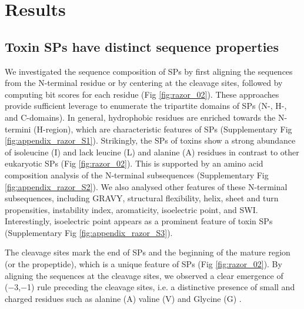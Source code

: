 \section{Results}
\subsection{Toxin SPs have distinct sequence properties}
We investigated the sequence composition of SPs by first aligning the sequences from the N-terminal residue or by centering at the cleavage sites, followed by computing bit scores for each residue (Fig  \ref{fig:razor_02}). These approaches provide sufficient leverage to enumerate the tripartite domains of SPs (N-, H-, and C-domains). In general, hydrophobic residues are enriched towards the N-termini (H-region), which are characteristic features of SPs \cite{Von_Heijne1990-sb} (Supplementary Fig \ref{fig:appendix_razor_S1}). Strikingly, the SPs of toxins show a strong abundance of isoleucine (I) and lack leucine (L) and alanine (A) residues in contrast to other eukaryotic SPs (Fig \ref{fig:razor_02}). This is supported by an amino acid composition analysis of the N-terminal subsequences (Supplementary Fig \ref{fig:appendix_razor_S2}). We also analysed other features of these N-terminal subsequences, including GRAVY, structural flexibility, helix, sheet and turn propensities, instability index, aromaticity, isoelectric point, and SWI. Interestingly, isoelectric point appears as a prominent feature of toxin SPs (Supplementary Fig \ref{fig:appendix_razor_S3}).


The cleavage sites mark the end of SPs and the beginning of the mature region (or the propeptide), which is a unique feature of SPs (Fig \ref{fig:razor_02}). By aligning the sequences at the cleavage sites, we observed a clear emergence of (−3,−1) rule preceding the cleavage sites, i.e. a distinctive presence of small and charged residues such as alanine (A) valine (V) and Glycine (G) \cite{Von_Heijne1983-hr}. %

